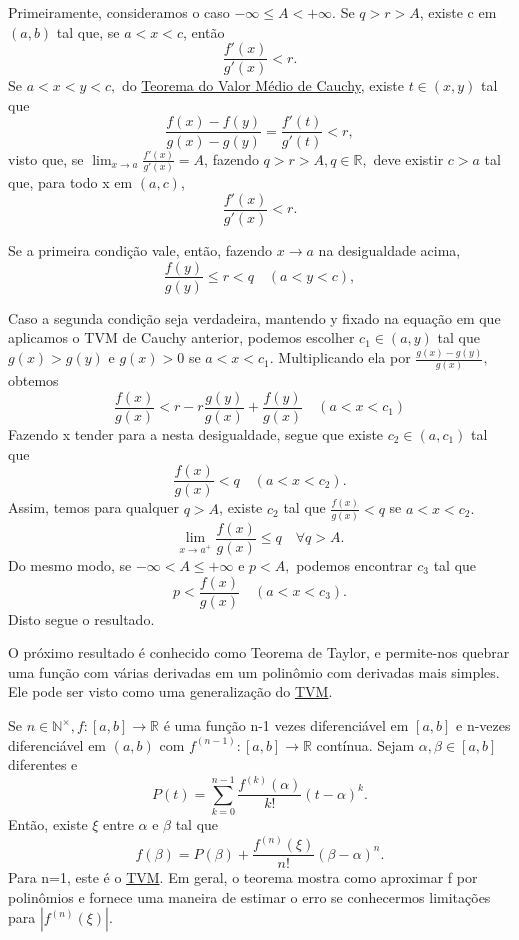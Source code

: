 \documentclass[Analysis/analysis_notes.tex]{subfiles}
\begin{document}
\begin{proof*}
	Primeiramente, consideramos o caso \(-\infty\leq A < +\infty\). Se \(q > r > A\),
	existe c em \((a, b)\) tal que, se \(a < x < c\), então
	\[
		\frac{f'(x)}{g'(x)} < r.
	\]
	Se \(a < x < y < c,\) do \hyperlink{cauchy_mvt}{Teorema do Valor Médio de Cauchy}, existe
	\(t\in (x, y)\) tal que
	\[
		\frac{f(x) - f(y)}{g(x) - g(y)} = \frac{f'(t)}{g'(t)} < r,
	\]
	visto que, se \(\lim_{x\to a}\frac{f'(x)}{g'(x)} = A\), fazendo \(q > r > A, q\in \mathbb{R},\)
	deve existir \(c > a\) tal que, para todo x em \((a, c)\),
	\[
		\frac{f'(x)}{g'(x)} < r.
	\]

	Se a primeira condi\c cão vale, então, fazendo \(x\rightarrow a\) na desigualdade acima,
	\[
		\frac{f(y)}{g(y)}\leq r < q \quad (a < y < c),
	\]

	Caso a segunda condi\c cão seja verdadeira, mantendo y fixado na equa\c cão em que aplicamos o TVM de Cauchy anterior,
	podemos escolher \(c_{1}\in (a, y)\) tal que \(g(x) > g(y) \) e \(g(x) > 0\) se
	\(a < x < c_{1}.\) Multiplicando ela por \(\frac{g(x)-g(y)}{g(x)},\) obtemos
	\[
		\frac{f(x)}{g(x)} < r - r\frac{g(y)}{g(x)} + \frac{f(y)}{g(x)}\quad (a < x < c_{1})
	\]
	Fazendo x tender para a nesta desigualdade, segue que existe \(c_{2}\in (a, c_{1})\)
	tal que
	\[
		\frac{f(x)}{g(x)} < q\quad (a < x < c_{2}).
	\]
	Assim, temos para qualquer \(q > A\), existe \(c_{2}\) tal que \(\frac{f(x)}{g(x)} < q\) se \(a < x < c_{2}.\)
	\[
		\lim_{x\to a^{+}} \frac{f(x)}{g(x)}\leq q \quad\forall q > A.
	\]
	Do mesmo modo, se \(-\infty < A\leq +\infty\) e \(p < A,\) podemos encontrar
	\(c_{3}\) tal que
	\[
		p < \frac{f(x)}{g(x)}\quad (a < x < c_{3}).
	\]
	Disto segue o resultado. \qedsymbol
\end{proof*}
O próximo resultado é conhecido como Teorema de Taylor, e permite-nos quebrar
uma fun\c cão com várias derivadas em um polinômio com derivadas mais simples.
Ele pode ser visto como uma generaliza\c cão do \hyperlink{mean_value}{TVM}.
\hypertarget{taylor}{
	\begin{theorem*}
		Se \(n\in \mathbb{N}^{\times}, f:[a, b]\rightarrow \mathbb{R}\) é uma fun\c cão
		n-1 vezes diferenciável em \([a, b]\) e n-vezes diferenciável em \((a, b)\) com
		\(f^{(n-1)}:[a, b]\rightarrow \mathbb{R}\) contínua. Sejam \(\alpha , \beta \in[a, b]\) diferentes
		e
		\[
			P(t) = \sum\limits_{k=0}^{n-1}\frac{f^{(k)}(\alpha )}{k!}(t-\alpha )^{k}.
		\]
		Então, existe \(\xi\) entre \(\alpha  \) e \(\beta \) tal que
		\[
			f(\beta ) = P(\beta ) + \frac{f^{(n)}(\xi)}{n!}(\beta -\alpha )^{n}.
		\]
		Para n=1, este é o \hyperlink{mean_value}{TVM}. Em geral, o teorema mostra
		como aproximar f por polinômios e fornece uma maneira de estimar o erro
		se conhecermos limita\c cões para \(|f^{(n)}(\xi)|.\)
	\end{theorem*}}
\end{document}
